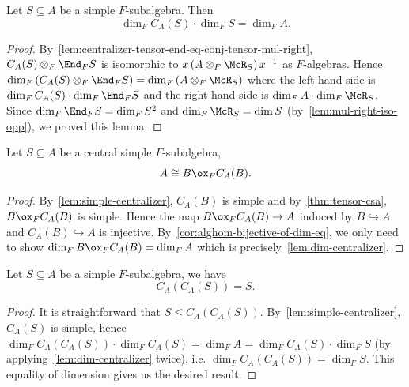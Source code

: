  \begin{lemma}
   \label{lem:dim-centralizer}
   Let $S\subseteq A$ be a simple $F$-subalgebra. Then
   \[
     \dim_{F}C_{A}(S)\cdot\dim_{F}S=\dim_{F}A.
   \]
   \leanok
 \end{lemma}
 \begin{proof}
   By~\cref{lem:centralizer-tensor-end-eq-conj-tensor-mul-right},
   $C_{A}(S) \otimes_{F}\End_{F}S$ is isomorphic to
   $x\left(A\otimes_{F}\McR_{S}\right)x^{-1}$ as $F$-algebras. Hence $\dim_{F}\left(C_{A}(S)\otimes_{F}\End_{F}S\right)=\dim_{F}\left(A\otimes_{F}\McR_{S}\right)$ where the left hand side is $\dim_{F}C_{A}(S)\cdot \dim_{F}\End_{F}S$ and the right hand side is $\dim_{F}A\cdot\dim_{F}\McR_{S}$. Since $\dim_{F}\End_{F}S=\dim_{F}S^{2}$ and $\dim_{F}\McR_{S}=\dim S$ (by~\cref{lem:mul-right-iso-opp}), we proved this lemma.
 \end{proof}

\begin{corollary}
  \label{cor:self-tensor-centralizer}
  Let $S \subseteq A$ be a central simple $F$-subalgebra,
  \[
    A \cong B \ox_{F} C_{A}(B).
  \]
  \leanok
\end{corollary}

\begin{proof}
  By~\cref{lem:simple-centralizer}, $C_{A}(B)$ is simple and by~\cref{thm:tensor-csa}, $B \ox_{F} C_{A}(B)$ is simple. Hence the map $B \ox_{F} C_{A}(B) \to A$ induced by $B \hookrightarrow A$ and $C_{A}(B) \hookrightarrow A$ is injective. By~\cref{cor:alghom-bijective-of-dim-eq}, we only need to show $\dim_{F}B\ox_{F}C_{A}(B) =\dim_{F}A$ which is precisely~\cref{lem:dim-centralizer}.
\end{proof}

 \begin{theorem}\label{thm:double-centralizer}
   Let $S\subseteq A$ be a simple $F$-subalgebra, we have
   \[
     C_{A}\left(C_{A}(S)\right) = S.
   \]
   \leanok
 \end{theorem}
 \begin{proof}
  It is straightforward that $S \le C_{A}\left(C_{A}(S)\right)$. By~\cref{lem:simple-centralizer}, $C_{A}(S)$ is simple, hence $\dim_{F}C_{A}\left(C_{A}(S)\right)\cdot \dim_{F}C_{A}(S)=\dim_{F}A=\dim_{F}C_{A}(S)\cdot \dim_{F}S$ (by applying~\cref{lem:dim-centralizer} twice), i.e. $\dim_{F}C_{A}\left(C_{A}(S)\right) = \dim_{F}S$. This equality of dimension gives us the desired result.
\end{proof}

